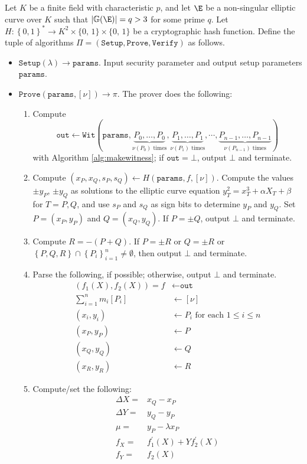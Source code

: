 \documentclass[11pt,letterpaper]{article}
\theoremstyle{definition}
\newcommand{\6}{\mathbf}
\newcommand{\7}{\mathcal}
\newcommand{\zo}{\{0, \, 1\}}
\begin{document}
Let $K$ be a finite field with characteristic $p$, and let $\E$ be a non-singular elliptic curve over $K$ such that $\left|\mathbb{G}(\E)\right| = q > 3$ for some prime $q$. Let $H:\left\{0,1\right\}^* \to K^2 \times \zo \times \zo$ be a cryptographic hash function. Define the tuple of algorithms $\Pi = (\texttt{Setup}, \texttt{Prove}, \texttt{Verify})$ as follows. 
\begin{itemize}
\item $\texttt{Setup}(\lambda) \to \texttt{params}$. Input security parameter and output setup parameters $\texttt{params}$.
\item $\texttt{Prove}(\texttt{params}, [\nu]) \to \pi$. The prover does the following:
\begin{enumerate}
\item \label{prove1} Compute \[\texttt{out} \leftarrow \texttt{Wit}(\texttt{params}, \underbrace{P_0, \ldots, P_0}_{\nu(P_0)\text{ times}}, \underbrace{P_1, \ldots, P_1}_{\nu(P_1)\text{ times}}, \cdots, \underbrace{P_{n-1}, \ldots, P_{n-1}}_{\nu(P_{n-1})\text{ times}})\] with Algorithm \ref{alg:makewitness}; if $\texttt{out} = \bot$, output $\bot$ and terminate.
\item \label{prove2} Compute $(x_P, x_Q, s_P, s_Q) \leftarrow H(\texttt{params}, f, [\nu])$. Compute the values $\pm y_P$, $\pm y_Q$ as solutions to the elliptic curve equation $y_T^2 = x_T^3 + \alpha X_T + \beta$ for $T=P,Q$, and use $s_P$ and $s_Q$ as sign bits to determine $y_P$ and $y_Q$. Set $P = (x_P, y_P)$ and $Q=(x_Q, y_Q)$. If $P = \pm Q$, output $\bot$ and terminate. \label{firststep}
\item \label{prove3} Compute $R = -(P + Q)$. If $P = \pm R$ or $Q = \pm R$ or $\left\{P, Q, R\right\} \cap \left\{P_i\right\}_{i=1}^{n} \neq \emptyset$, then output $\bot$ and terminate. %

\item \label{prove4} Parse the following, if possible; otherwise, output $\bot$ and terminate.
\begin{align*}
(f_1(X), f_2(X)) = f &\leftarrow \texttt{out} \\%
\sum_{i=1}^{n} m_i [P_i] &\leftarrow [\nu] \\
(x_i, y_i) &\leftarrow P_i\text{ for each }1 \leq i \leq n \\
(x_P, y_P) &\leftarrow P \\
(x_Q, y_Q) &\leftarrow Q \\
(x_R, y_R) &\leftarrow R
\end{align*}
\item \label{prove5} Compute/set the following: 
\begin{align*}
\Delta X =& x_Q - x_P\\
\Delta Y =& y_Q - y_P\\
\mu =& y_P - \lambda x_P \\
f_X =& f_1^\prime(X) + Yf_2^\prime(X)\\
f_Y =& f_2(X)
\end{align*}


\end{enumerate}
\end{itemize}
\end{document}
